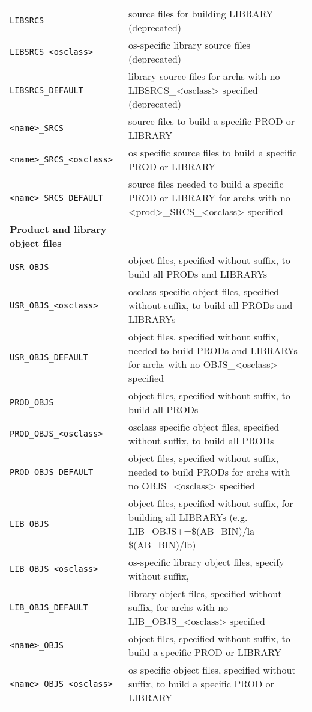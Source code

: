 \begin{center}
\begin{longtable}{p{2.94784in}p{3.76247in}}
\verb|LIBSRCS| & source files for building LIBRARY (deprecated)\\
\verb|LIBSRCS_<osclass>| & os-specific library source files (deprecated)\\
\verb|LIBSRCS_DEFAULT| & library source files for archs with no LIBSRCS\_\textless{}osclass\textgreater{} specified (deprecated)\\
\verb|<name>_SRCS| & source files to build a specific PROD or LIBRARY\\
\verb|<name>_SRCS_<osclass>| & os specific source files to build a specific PROD or LIBRARY\\
\verb|<name>_SRCS_DEFAULT| & source files needed to build a specific PROD or LIBRARY for archs with no \textless{}prod\textgreater{}\_SRCS\_\textless{}osclass\textgreater{} specified\\
\textbf{Product and library object files} & \\
\verb|USR_OBJS| & object files, specified without suffix, to build all PRODs and LIBRARYs\\
\verb|USR_OBJS_<osclass>| & osclass specific object files, specified without suffix, to build all PRODs and LIBRARYs\\
\verb|USR_OBJS_DEFAULT| & object files, specified without suffix, needed to build PRODs and LIBRARYs for archs with no OBJS\_\textless{}osclass\textgreater{} specified\\
\verb|PROD_OBJS| & object files, specified without suffix, to build all PRODs\\
\verb|PROD_OBJS_<osclass>| & osclass specific object files, specified without suffix, to build all PRODs\\
\verb|PROD_OBJS_DEFAULT| & object files, specified without suffix, needed to build PRODs for archs with no OBJS\_\textless{}osclass\textgreater{} specified\\
\verb|LIB_OBJS| & object files, specified without suffix, for building all LIBRARYs (e.g. LIB\_OBJS+=\$(AB\_BIN)/la \$(AB\_BIN)/lb)\\
\verb|LIB_OBJS_<osclass>| & os-specific library object files, specify without suffix,\\
\verb|LIB_OBJS_DEFAULT| & library object files, specified without suffix, for archs with no LIB\_OBJS\_\textless{}osclass\textgreater{} specified\\
\verb|<name>_OBJS| & object files, specified without suffix, to build a specific PROD or LIBRARY\\
\verb|<name>_OBJS_<osclass>| & os specific object files, specified without suffix, to build a specific PROD or LI\textbar{}BRARY\\

\end{longtable}
\end{center}
